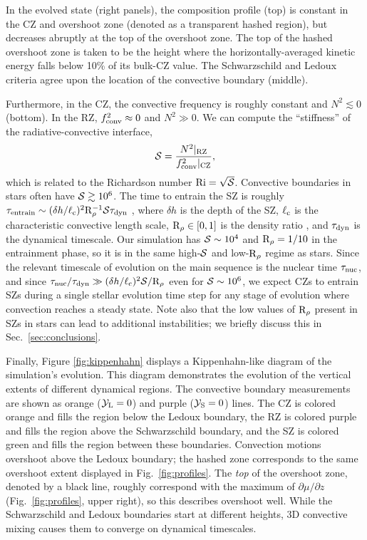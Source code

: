 In the evolved state (right panels), the composition profile (top) is constant in the CZ and overshoot zone (denoted as a transparent hashed region), but decreases abruptly at the top of the overshoot zone.
The top of the hashed overshoot zone is taken to be the height where the horizontally-averaged kinetic energy falls below 10\% of its bulk-CZ value.
The Schwarzschild and Ledoux criteria agree upon the location of the convective boundary (middle).

Furthermore, in the CZ, the convective frequency is roughly constant and $N^2 \lesssim 0$ (bottom).
In the RZ, $f_{\rm{conv}}^2 \approx 0$ and $N^2 \gg 0$.
We can compute the ``stiffness'' of the radiative-convective interface,
\begin{equation}
\mS = \frac{N^2|_{\rm{RZ}}}{f_{\rm{conv}}^2|_{\rm{CZ}}},
\label{eqn:stiffness}
\end{equation}
which is related to the Richardson number $\rm{Ri} = \sqrt{\mathcal{S}}$.
Convective boundaries in stars often have $\mathcal{S} \gtrsim 10^6$.
The time to entrain the SZ is roughly ${\tau_{\rm{entrain}} \sim (\delta h / \ell_{\rm{c}})^2 \rm{R}_{\rho}^{-1} \mathcal{S} \tau_{\rm{dyn}}}$ \citep[per][eqn.~3]{fuentes_cumming_2020}, where $\delta h$ is the depth of the SZ, $\ell_{\rm{c}}$ is the characteristic convective length scale, $\mathrm{R}_{\rho} \in [0, 1]$ is the density ratio \citep[see][eqn.~7]{garaud_2018}, and $\tau_{\rm{dyn}}$ is the dynamical timescale.
Our simulation has $\mathcal{S} \sim 10^{4}$ and $\rm{R}_\rho = 1/10$ in the entrainment phase, so it is in the same high-$\mathcal{S}$ and low-$\rm{R}_\rho$ regime as stars.
Since the relevant timescale of evolution on the main sequence is the nuclear time $\tau_{\rm{nuc}}$, and since $\tau_{\rm{nuc}}/\tau_{\rm{dyn}} \gg (\delta h/\ell_{\rm{c}})^2 \mathcal{S}/\mathrm{R}_{\rho}$ even for $\mathcal{S} \sim 10^6$, we expect CZs to entrain SZs during a single stellar evolution time step for any stage of evolution where convection reaches a steady state.
Note also that the low values of $\mathrm{R}_{\rho}$ present in SZs in stars can lead to additional instabilities; we briefly discuss this in Sec.~\ref{sec:conclusions}.

Finally, Figure \ref{fig:kippenhahn} displays a Kippenhahn-like diagram of the simulation's evolution.
This diagram demonstrates the evolution of the vertical extents of different dynamical regions.
The convective boundary measurements are shown as orange ($\mathcal{Y}_{\rm{L}} = 0$) and purple ($\mathcal{Y}_{\rm{S}} = 0$) lines.
The CZ is colored orange and fills the region below the Ledoux boundary, the RZ is colored purple and fills the region above the Schwarzschild boundary, and the SZ is colored green and fills the region between these boundaries.
Convection motions overshoot above the Ledoux boundary; the hashed zone corresponds to the same overshoot extent displayed in Fig.~\ref{fig:profiles}.
The \emph{top} of the overshoot zone, denoted by a black line, roughly correspond with the maximum of $\partial\mu/\partial z$ (Fig.~\ref{fig:profiles}, upper right), so this describes overshoot well.
While the Schwarzschild and Ledoux boundaries start at different heights, 3D convective mixing causes them to converge on dynamical timescales.


